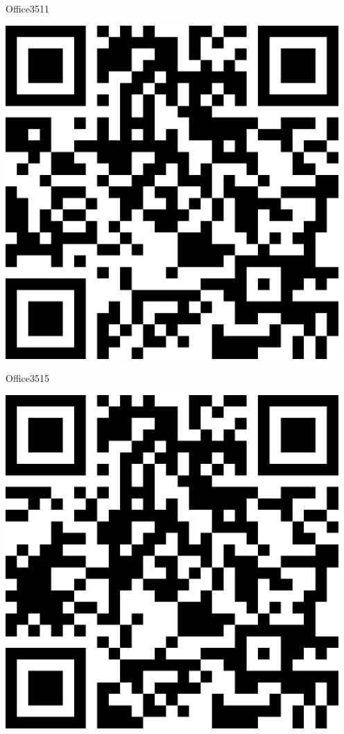 \documentclass[letterpaper]{article}
\begin{document}
 \hfill{\small Office3511} 

 \vspace{1in} 
 \pagebreak 
{} 
 \vspace*{\fill} 
 \begingroup 
 \centerline{\includegraphics[scale=1,width=5in,height=5in]{Office3515.png}} 
 \endgroup 
 \vspace*{\fill} 

 \hfill{\small Office3515} 

 \vspace{1in} 
 \pagebreak 
{} 
 \vspace*{\fill} 
 \begingroup 
 \centerline{\includegraphics[scale=1,width=5in,height=5in]{Office3517.png}} 
 \endgroup 
 \vspace*{\fill} 
\end{document}

